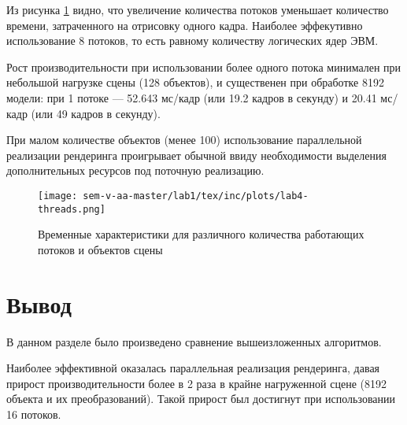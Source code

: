 Из рисунка \ref{fig:timestamps} видно, что увеличение количества потоков уменьшает количество времени, затраченного на отрисовку одного кадра. Наиболее эффекутивно использование 8 потоков, то есть равному количеству логических ядер ЭВМ. 

Рост производительности при использовании более одного потока минимален при небольшой нагрузке сцены (128 объектов), и существенен при обработке 8192 модели: при 1 потоке --- 52.643 мс/кадр (или 19.2 кадров в секунду) и 20.41 мс/кадр (или 49 кадров в секунду).

При малом количестве объектов (менее 100) использование параллельной реализации рендеринга проигрывает обычной ввиду необходимости выделения дополнительных ресурсов под поточную реализацию. 

\begin{figure}
    \centering
\texttt{[image: sem-v-aa-master/lab1/tex/inc/plots/lab4-threads.png]}

    \caption{Временные характеристики для различного количества работающих потоков и объектов сцены}
    \label{fig:timestamps}
\end{figure}

\section{Вывод}
В данном разделе было произведено сравнение вышеизложенных алгоритмов.

Наиболее эффективной оказалась параллельная реализация рендеринга, давая прирост производительности более в 2 раза в крайне нагруженной сцене (8192 объекта и их преобразований). Такой прирост был достигнут при использовании 16 потоков.


